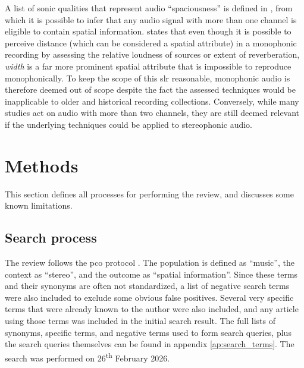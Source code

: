 \documentclass[referee,pdflatex,sn-mathphys-num]{sn-jnl}%
\newcommand{\searchdate}{26\textsuperscript{th} February 2026}
\newcommand{\q}[1]{\enquote{#1}}
\begin{document}
A list of sonic qualities that represent audio \q{spaciousness} is defined in \cite{bergSystematicEvaluationPerceived2003}, from which it is possible to infer that any audio signal with more than one channel is eligible to contain spatial information. \cite{rumseySpatialQualityEvaluation2002} states that even though it is possible to perceive distance (which can be considered a spatial attribute) in a monophonic recording by assessing the relative loudness of sources or extent of reverberation, \textit{width} is a far more prominent spatial attribute that is impossible to reproduce monophonically. To keep the scope of this \gls{slr} reasonable, monophonic audio is therefore deemed out of scope despite the fact the assessed techniques would be inapplicable to older and historical recording collections. Conversely, while many studies act on audio with more than two channels, they are still deemed relevant if the underlying techniques could be applied to stereophonic audio.


\section{Methods}\label{sec:methods}

This section defines all processes for performing the review, and discusses some known limitations.

\subsection{Search process}\label{sec:search_process}

The review follows the \gls{pco} protocol \cite{pollockHowSystematicReview2018}. The population is defined as \q{music}, the context as \q{stereo}, and the outcome as \q{spatial information}. Since these terms and their synonyms are often not standardized, a list of negative search terms were also included to exclude some obvious false positives. Several very specific terms that were already known to the author were also included, and any article using those terms was included in the initial search result. The full lists of synonyms, specific terms, and negative terms used to form search queries, plus the search queries themselves can be found in appendix \ref{ap:search_terms}. The search was performed on \searchdate.
\end{document}
